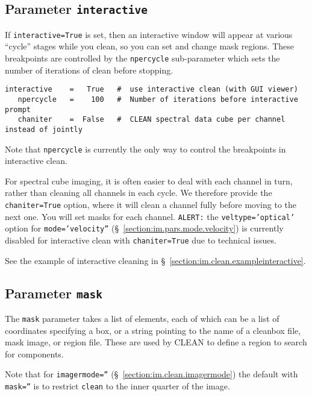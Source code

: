 \subsection{Parameter {\tt interactive} }
\label{section:im.clean.interactive}

If {\tt interactive=True} is set, then an interactive window
will appear at various ``cycle'' stages while you clean, so you
can set and change mask regions.  These breakpoints are controlled
by the {\tt npercycle} sub-parameter which sets the number of
iterations of clean before stopping.
\small
\begin{verbatim}
interactive    =   True   #  use interactive clean (with GUI viewer)
   npercycle   =    100   #  Number of iterations before interactive prompt
   chaniter    =  False   #  CLEAN spectral data cube per channel instead of jointly
\end{verbatim}
\normalsize
Note that {\tt npercycle} is currently the only way to control the
breakpoints in interactive clean. 

For spectral cube imaging, it is often easier to deal with each
channel in turn, rather than cleaning all channels in each cycle.
We therefore provide the {\tt chaniter=True} option, where it will
clean a channel fully before moving to the next one.  You will set
masks for each channel.  {\tt ALERT:} the {\tt veltype='optical'}
option for {\tt mode='velocity''} 
(\S~\ref{section:im.pars.mode.velocity}) is currently disabled for 
interactive clean with {\tt chaniter=True} due to technical issues.

See the example of interactive cleaning in 
\S~\ref{section:im.clean.exampleinteractive}.

\subsection{Parameter {\tt mask} }
\label{section:im.clean.mask}

The {\tt mask} parameter takes a list of elements, each of which can
be a list of coordinates specifying a box,
or a string pointing to the name of a cleanbox file, mask image, or
region file.  These are used by CLEAN to define a region to search for components.  

Note that for {\tt imagermode=''} (\S~\ref{section:im.clean.imagermode}) 
the default with {\tt mask=''} is to restrict {\tt clean} to the inner
quarter of the image.

